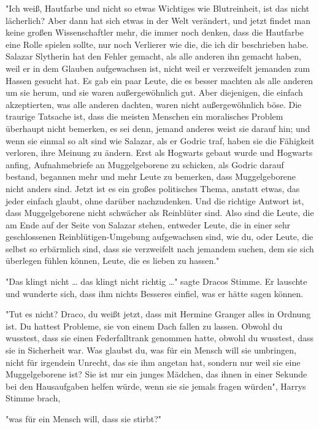 {"Ich weiß, Hautfarbe und nicht so etwas Wichtiges wie Blutreinheit, ist das nicht lächerlich? Aber dann hat sich etwas in der Welt verändert, und jetzt findet man keine großen Wissenschaftler mehr, die immer noch denken, dass die Hautfarbe eine Rolle spielen sollte, nur noch Verlierer wie die, die ich dir beschrieben habe. Salazar Slytherin hat den Fehler gemacht, als alle anderen ihn gemacht haben, weil er in dem Glauben aufgewachsen ist, nicht weil er verzweifelt jemanden zum Hassen gesucht hat. Es gab ein paar Leute, die es besser machten als alle anderen um sie herum, und sie waren außergewöhnlich gut. Aber diejenigen, die einfach akzeptierten, was alle anderen dachten, waren nicht außergewöhnlich böse. Die traurige Tatsache ist, dass die meisten Menschen ein moralisches Problem überhaupt nicht bemerken, es sei denn, jemand anderes weist sie darauf hin; und wenn sie einmal so alt sind wie Salazar, als er Godric traf, haben sie die Fähigkeit verloren, ihre Meinung zu ändern. Erst als Hogwarts gebaut wurde und Hogwarts anfing, Aufnahmebriefe an Muggelgeborene zu schicken, als Godric darauf bestand, begannen mehr und mehr Leute zu bemerken, dass Muggelgeborene nicht anders sind. Jetzt ist es ein großes politisches Thema, anstatt etwas, das jeder einfach glaubt, ohne darüber nachzudenken. Und die richtige Antwort ist, dass Muggelgeborene nicht schwächer als Reinblüter sind. Also sind die Leute, die am Ende auf der Seite von Salazar stehen, entweder Leute, die in einer sehr geschlossenen Reinblütigen-Umgebung aufgewachsen sind, wie du, oder Leute, die selbst so erbärmlich sind, dass sie verzweifelt nach jemandem suchen, dem sie sich überlegen fühlen können, Leute, die es lieben zu hassen."

"Das klingt nicht … das klingt nicht richtig …" sagte Dracos Stimme. Er lauschte und wunderte sich, dass ihm nichts Besseres einfiel, was er hätte sagen können.

"Tut es nicht? Draco, du weißt jetzt, dass mit Hermine Granger alles in Ordnung ist. Du hattest Probleme, sie von einem Dach fallen zu lassen. Obwohl du wusstest, dass sie einen Federfalltrank genommen hatte, obwohl du wusstest, dass sie in Sicherheit war. Was glaubst du, was für ein Mensch will sie umbringen, nicht für irgendein Unrecht, das sie ihm angetan hat, sondern nur weil sie eine Muggelgeborene ist? Sie ist nur ein junges Mädchen, das ihnen in einer Sekunde bei den Hausaufgaben helfen würde, wenn sie sie jemals fragen würden", Harrys Stimme brach,

"was für ein Mensch will, dass sie stirbt?"

}
